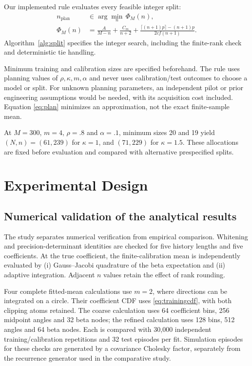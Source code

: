 \documentclass[nolineno]{ieeeaccess}
\begin{document}
Our implemented rule evaluates every feasible integer split:
\begin{align}
n_{\mathrm{plan}}&\in\arg\min_n\,\Phi_M(n),\nonumber\\
\Phi_M(n)&=\frac{A}{M-n}+\frac{C_m}{n+2}
+\frac{\lceil(n+1)p\rceil-(n+1)p}{2cf(n+1)}.
\label{eq:plan}
\end{align}
Algorithm~\ref{alg:split} specifies the integer search, including the finite-rank check and deterministic tie handling.

Minimum training and calibration sizes are specified beforehand. The rule uses planning values of $\rho,\kappa,m,\alpha$ and never uses calibration/test outcomes to choose a model or split. For unknown planning parameters, an independent pilot or prior engineering assumptions would be needed, with its acquisition cost included. Equation \eqref{eq:plan} minimizes an approximation, not the exact finite-sample mean.

At $M=300$, $m=4$, $\rho=.8$ and $\alpha=.1$, minimum sizes 20 and 19 yield $(N,n)=(61,239)$ for $\kappa=1$, and $(71,229)$ for $\kappa=1.5$. These allocations are fixed before evaluation and compared with alternative prespecified splits.

\section{Experimental Design}
\subsection{Numerical validation of the analytical results}
The study separates numerical verification from empirical comparison. Whitening and precision-determinant identities are checked for five history lengths and five coefficients. At the true coefficient, the finite-calibration mean is independently evaluated by (i) Gauss--Jacobi quadrature of the beta expectation and (ii) adaptive integration. Adjacent $n$ values retain the effect of rank rounding.

Four complete fitted-mean calculations use $m=2$, where directions can be integrated on a circle. Their coefficient CDF uses \eqref{eq:trainingcdf}, with both clipping atoms retained. The coarse calculation uses 64 coefficient bins, 256 midpoint angles and 32 beta nodes; the refined calculation uses 128 bins, 512 angles and 64 beta nodes. Each is compared with 30,000 independent training/calibration repetitions and 32 test episodes per fit. Simulation episodes for these checks are generated by a covariance Cholesky factor, separately from the recurrence generator used in the comparative study.
\end{document}

